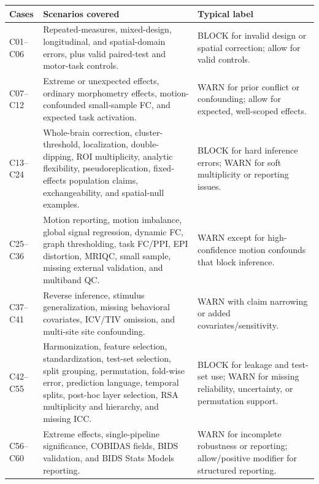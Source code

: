 \begin{longtable}{|>{\RaggedRight\hspace{0pt}\arraybackslash}p{}|>{\RaggedRight\hspace{0pt}\arraybackslash}p{}|>{\RaggedRight\hspace{0pt}\arraybackslash}p{}|}
\hline
\rowcolor{brtablehead}\textbf{Cases} & \textbf{Scenarios covered} & \textbf{Typical label} \\
\hline
C01--C06 & Repeated-measures, mixed-design, longitudinal, and spatial-domain errors, plus valid paired-test and motor-task controls. & BLOCK for invalid design or spatial correction; allow for valid controls. \\
\hline
C07--C12 & Extreme or unexpected effects, ordinary morphometry effects, motion-confounded small-sample FC, and expected task activation. & WARN for prior conflict or confounding; allow for expected, well-scoped effects. \\
\hline
C13--C24 & Whole-brain correction, cluster-threshold, localization, double-dipping, ROI multiplicity, analytic flexibility, pseudoreplication, fixed-effects population claims, exchangeability, and spatial-null examples. & BLOCK for hard inference errors; WARN for soft multiplicity or reporting issues. \\
\hline
C25--C36 & Motion reporting, motion imbalance, global signal regression, dynamic FC, graph thresholding, task FC/PPI, EPI distortion, MRIQC, small sample, missing external validation, and multiband QC. & WARN except for high-confidence motion confounds that block inference. \\
\hline
C37--C41 & Reverse inference, stimulus generalization, missing behavioral covariates, ICV/TIV omission, and multi-site site confounding. & WARN with claim narrowing or added covariates/sensitivity. \\
\hline
C42--C55 & Harmonization, feature selection, standardization, test-set selection, split grouping, permutation, fold-wise error, prediction language, temporal splits, post-hoc layer selection, RSA multiplicity and hierarchy, and missing ICC. & BLOCK for leakage and test-set use; WARN for missing reliability, uncertainty, or permutation support. \\
\hline
C56--C60 & Extreme effects, single-pipeline significance, COBIDAS fields, BIDS validation, and BIDS Stats Models reporting. & WARN for incomplete robustness or reporting; allow/positive modifier for structured reporting. \\
\hline
\end{longtable}

